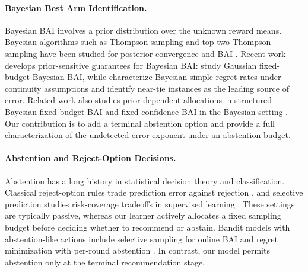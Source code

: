 \documentclass[10pt]{article}
\theoremstyle{plain}
\begin{document}
\paragraph{Bayesian Best Arm Identification.}
Bayesian BAI involves a prior distribution over the unknown reward means. Bayesian
algorithms such as Thompson sampling and top-two Thompson sampling have been
studied for posterior convergence and BAI
\citep{russo2020simple,shang2020fixed}. Recent work develops prior-sensitive
guarantees for Bayesian BAI: \citet{atsidakou2023bayesian} study Gaussian fixed-budget Bayesian BAI, while \citet{komiyama2024rate} characterize Bayesian simple-regret rates under continuity assumptions and identify near-tie instances as the leading source of error. Related work also studies prior-dependent
allocations in structured Bayesian fixed-budget BAI
\citep{nguyen2025prior} and fixed-confidence BAI in the Bayesian setting
\citep{jang2024fixed}. Our contribution is to add a
terminal abstention option and provide a full characterization of  the undetected error exponent
under an abstention budget.


\paragraph{Abstention and Reject-Option Decisions.}
Abstention has a long history in statistical decision theory and classification.
Classical reject-option rules trade prediction error against rejection \citep{chow1970optimum}, and selective prediction studies risk-coverage tradeoffs in supervised learning \citep{bartlett2008classification,cortes2016learning}.
These settings are typically passive, whereas our learner actively allocates a fixed sampling budget before deciding whether to recommend or abstain. Bandit models with abstention-like actions include selective sampling for online BAI \citep{camilleri2021selective} and regret minimization with per-round abstention \citep{yang2026abstention}. In contrast, our model permits abstention only at the terminal recommendation stage.
\end{document}
